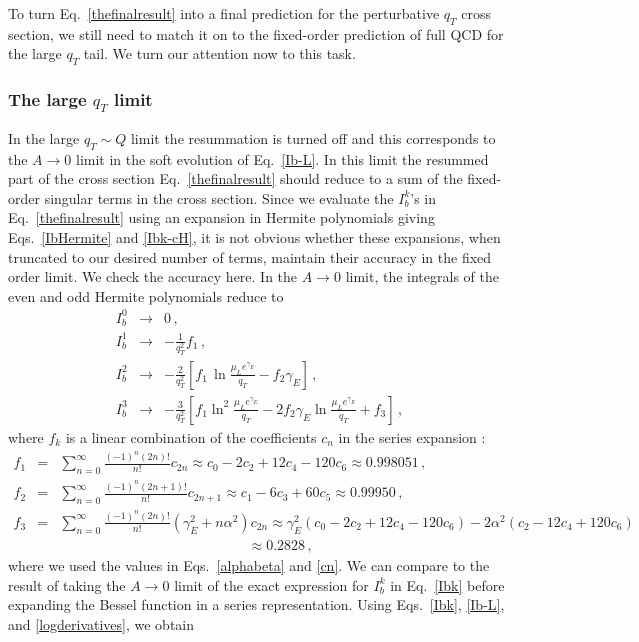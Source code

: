 \documentclass[a4,letterpaper,11pt]{article}
\newcommand{\nn}{\nonumber}
\newcommand{\bea}{\begin{eqnarray}}
\newcommand{\eea}{\end{eqnarray}}
\newcommand{\eq}[1]{Eq.~\eqref{#1}}
\newcommand{\eqs}[2]{Eqs.~\eqref{#1} and \eqref{#2}}
\newcommand{\eqss}[3]{Eqs.~\eqref{#1}, \eqref{#2}, and \eqref{#3}}
\begin{document}
To turn \eq{thefinalresult} into a final prediction for the perturbative $q_T$ cross section, we still need to match it on to the fixed-order prediction of full QCD for the large $q_T$ tail. We turn our attention now to this task.

\subsubsection{The large $q_T$ limit}
\label{ssec:largeqT}

In the large $q_T\sim Q$ limit the resummation is turned off and this corresponds to the $A\to 0$ limit in the soft evolution of \eq{Ib-L}. In this limit the resummed part of the cross section \eq{thefinalresult} should reduce to a sum of the fixed-order singular terms in the cross section.
Since we evaluate the $I_b^k$'s in \eq{thefinalresult} using an expansion in Hermite polynomials giving \eqs{IbHermite}{Ibk-cH}, it is not obvious whether these expansions, when truncated to our desired number of terms, maintain their accuracy in the fixed order limit. We check the accuracy here.
In the $A\to 0$ limit, the integrals of the even and odd Hermite polynomials reduce to
\bea\label{Ibk-limit}
I_b^0 &\to& 0
\,,\nn\\
I_b^1 &\to& -\frac{1}{q_T^2} f_1  
\,,\nn\\
I_b^2 &\to& -\frac{2}{q_T^2} 
\left[ f_1 \, \ln\frac{\mu_L e^{\gamma_E}}{q_T} -f_2 \gamma_E \right] 
\,,\nn\\
I_b^3 &\to&-\frac{3}{q_T^2}
\left[f_1 \ln^2\frac{\mu_L e^{\gamma_E}}{q_T}  -2 f_2 \gamma_E  \ln\frac{\mu_L e^{\gamma_E}}{q_T} + f_3   \right]
\,,
 \eea
where $f_k$ is a linear combination of the coefficients $c_n$ in the series expansion :
\bea \label{fn}
f_1 &=& \sum_{n=0}^{\infty} \frac{(-1)^n (2n)!}{n!}c_{2n} \approx c_0-2c_2+12 c_4 -120 c_6\approx 0.998051
\,,\\
f_2 &=& \sum_{n=0}^{\infty} \frac{(-1)^n (2n+1)!}{n!}c_{2n+1}\approx c_1-6 c_3 +60 c_5 \approx  0.99950
\,,\nn\\
f_3 &=& \sum_{n=0}^{\infty} \frac{(-1)^n (2n)!}{n!}\left(\gamma_E^2+n \alpha^2\right)  c_{2n}
\approx \gamma_E^2 (c_0-2 c_2+12 c_4-120 c_6)-2\alpha^2( c_2-12 c_4+120c_6)   \nn \\
& & \qquad\qquad\qquad\qquad\qquad\qquad\quad\ \ \approx 0.2828
\nn\,,
\eea
where we used the values in \eqs{alphabeta}{cn}.
We can compare to the result of taking the $A\to 0 $ limit of the exact expression for $I_b^k$ in \eq{Ibk} before expanding the Bessel function in a series representation. Using \eqss{Ibk}{Ib-L}{logderivatives}, we obtain
\end{document}
